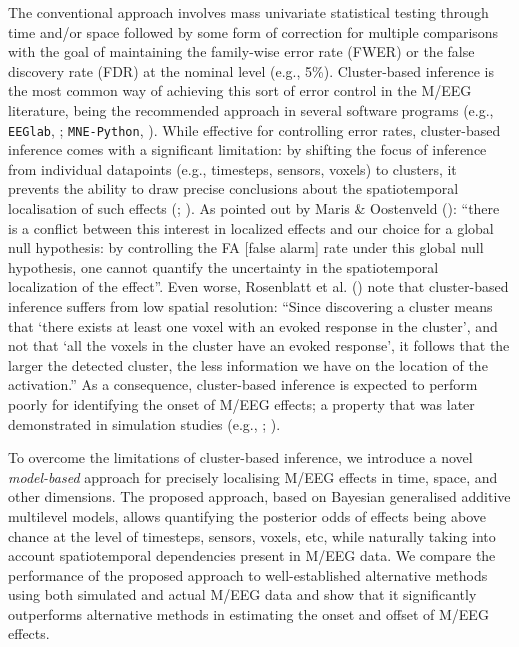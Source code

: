 \documentclass[
  doc,
  floatsintext,
  longtable,
  a4paper,
  nolmodern,
  notxfonts,
  notimes,
  colorlinks=true,linkcolor=blue,citecolor=blue,urlcolor=blue]{apa7}
\begin{document}
The conventional approach involves mass univariate statistical testing
through time and/or space followed by some form of correction for
multiple comparisons with the goal of maintaining the family-wise error
rate (FWER) or the false discovery rate (FDR) at the nominal level
(e.g., 5\%). Cluster-based inference is the most common way of achieving
this sort of error control in the M/EEG literature, being the
recommended approach in several software programs (e.g.,
\texttt{EEGlab}, ;
\texttt{MNE-Python}, ). While
effective for controlling error rates, cluster-based inference comes
with a significant limitation: by shifting the focus of inference from
individual datapoints (e.g., timesteps, sensors, voxels) to clusters, it
prevents the ability to draw precise conclusions about the
spatiotemporal localisation of such effects
(;
). As
pointed out by Maris \& Oostenveld ():
``there is a conflict between this interest in localized effects and our
choice for a global null hypothesis: by controlling the FA {[}false
alarm{]} rate under this global null hypothesis, one cannot quantify the
uncertainty in the spatiotemporal localization of the effect''. Even
worse, Rosenblatt et al. () note that
cluster-based inference suffers from low spatial resolution: ``Since
discovering a cluster means that `there exists at least one voxel with
an evoked response in the cluster', and not that `all the voxels in the
cluster have an evoked response', it follows that the larger the
detected cluster, the less information we have on the location of the
activation.'' As a consequence, cluster-based inference is expected to
perform poorly for identifying the onset of M/EEG effects; a property
that was later demonstrated in simulation studies (e.g.,
;
).

To overcome the limitations of cluster-based inference, we introduce a
novel \emph{model-based} approach for precisely localising M/EEG effects
in time, space, and other dimensions. The proposed approach, based on
Bayesian generalised additive multilevel models, allows quantifying the
posterior odds of effects being above chance at the level of timesteps,
sensors, voxels, etc, while naturally taking into account spatiotemporal
dependencies present in M/EEG data. We compare the performance of the
proposed approach to well-established alternative methods using both
simulated and actual M/EEG data and show that it significantly
outperforms alternative methods in estimating the onset and offset of
M/EEG effects.
\end{document}
